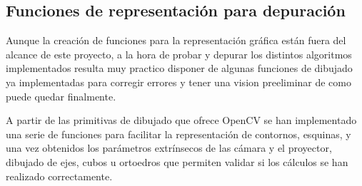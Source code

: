 \subsection{Funciones de representación para depuración}
Aunque la creación de funciones para la representación gráfica están fuera del alcance de este proyecto, a la hora de probar y depurar los distintos algoritmos implementados resulta muy practico disponer de algunas funciones de dibujado ya implementadas para corregir errores y tener una vision preeliminar de como puede quedar finalmente.

A partir de las primitivas de dibujado que ofrece OpenCV se han implementado una serie de funciones para facilitar la representación de contornos, esquinas, y una vez obtenidos los parámetros extrínsecos de las cámara y el proyector, dibujado de ejes, cubos u ortoedros que permiten validar si los cálculos se han realizado correctamente.





